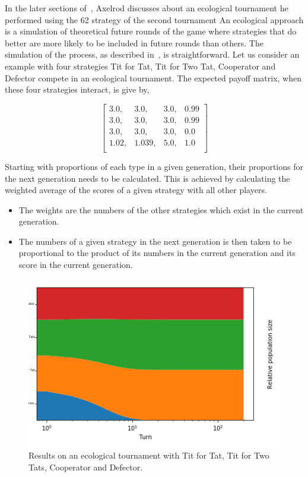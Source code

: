 \documentclass{article}
\theoremstyle{definition}
\begin{document}
In the later sections of~\cite{Axelrod1980b}, Axelrod discusses about
an ecological tournament he performed using the 62 strategy of the second tournament
An ecological approach is a simulation of theoretical
future rounds of the game where strategies that do better are more likely to be
included in future rounds than others.
The simulation of the process, as described in~\cite{Axelrod1980b}, is straightforward.
Let us consider an example with four strategies Tit for Tat, Tit for Two Tat,
Cooperator and Defector compete in an ecological tournament.
The expected payoff matrix, when these four strategies interact, is give by,

\[\begin{bmatrix}
    3.0,  & 3.0,  & 3.0, & 0.99 \\
    3.0,  & 3.0,  & 3.0, & 0.99 \\
    3.0,  & 3.0,  & 3.0, & 0.0  \\
    1.02, & 1.039,& 5.0, & 1.0 \\
\end{bmatrix}\]

Starting with proportions of each type in a given generation, their proportions
for the next generation needs to be calculated. This is achieved by calculating
the weighted average of the scores of a given strategy with all other players.

\begin{itemize}
    \item The weights are the numbers of the other strategies which
    exist in the current generation.
    \item The numbers of a given strategy in the next generation is then taken to
    be proportional to the product of its numbers in the current generation and
    its score in the current generation.
\end{itemize}

\begin{figure}[!hbtp]
    \centering
    \includegraphics[width=.6\textwidth]{./assets/images/ecological_tournament.png}
    \caption{Results on an ecological tournament with Tit for Tat, Tit for Two Tats,
    Cooperator and Defector.}
    \label{fig:ecological_tournament}
\end{figure}
\end{document}
